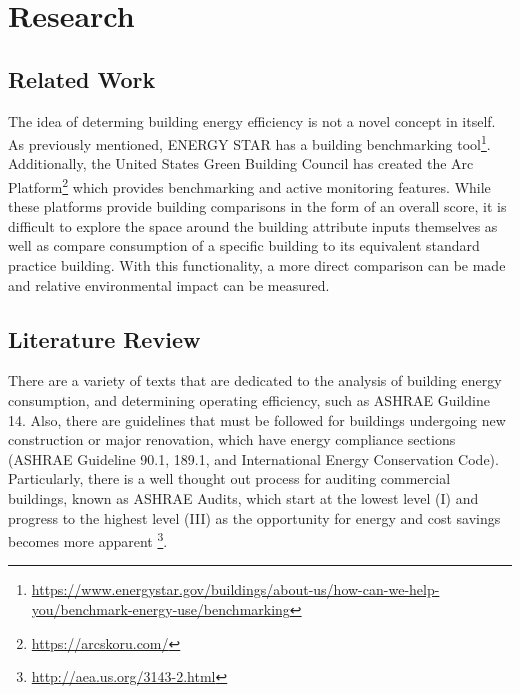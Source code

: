 \section*{Research}
\label{sec:literature_review}

\subsection{Related Work}
The idea of determing building energy efficiency is not a novel concept in itself.  As previously mentioned, ENERGY STAR has a building benchmarking tool\footnote{\href{https://www.energystar.gov/buildings/about-us/how-can-we-help-you/benchmark-energy-use/benchmarking }{\url{https://www.energystar.gov/buildings/about-us/how-can-we-help-you/benchmark-energy-use/benchmarking}}}.  Additionally, the United States Green Building Council has created the Arc Platform\footnote{\href{https://arcskoru.com/}{\url{https://arcskoru.com/}}} which provides benchmarking and active monitoring features.  While these platforms provide building comparisons in the form of an overall score, it is difficult to explore the space around the building attribute inputs themselves as well as compare consumption of a specific building to its equivalent standard practice building.  With this functionality, a more direct comparison can be made and relative environmental impact can be measured.

\subsection{Literature Review}

There are a variety of texts that are dedicated to the analysis of building energy consumption, and determining operating efficiency, such as ASHRAE Guildine 14.  Also, there are guidelines that must be followed for buildings undergoing new construction or major renovation, which have energy compliance sections (ASHRAE Guideline 90.1, 189.1, and International Energy Conservation Code).  Particularly, there is a well thought out process for auditing commercial buildings, known as ASHRAE Audits, which start at the lowest level (I) and progress to the highest level (III) as the opportunity for energy and cost savings becomes more apparent \footnote{\href{http://aea.us.org/3143-2.html}{\url{http://aea.us.org/3143-2.html}}}.  